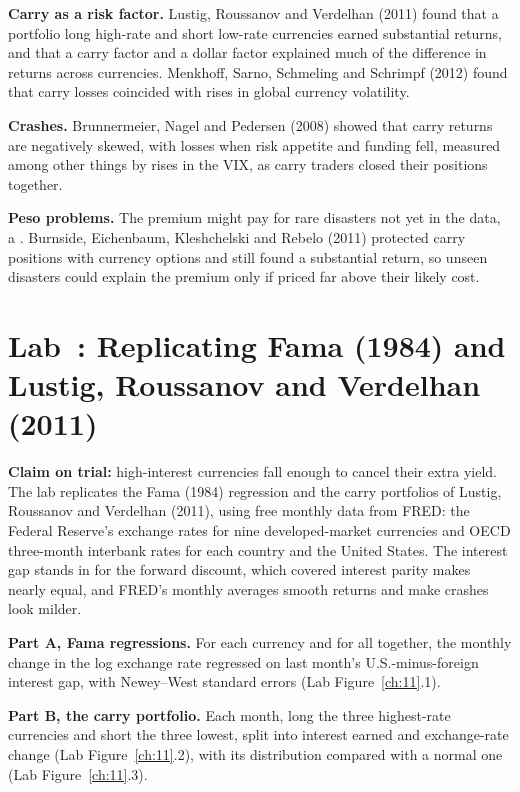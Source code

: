 \textbf{Carry as a risk factor.} Lustig, Roussanov and Verdelhan (2011) found that a portfolio long high-rate and short low-rate currencies earned substantial returns, and that a carry factor and a dollar factor explained much of the difference in returns across currencies. Menkhoff, Sarno, Schmeling and Schrimpf (2012) found that carry losses coincided with rises in global currency volatility.

\textbf{Crashes.} Brunnermeier, Nagel and Pedersen (2008) showed that carry returns are negatively skewed, with losses when risk appetite and funding fell, measured among other things by rises in the VIX, as carry traders closed their positions together.

\textbf{Peso problems.} The premium might pay for rare disasters not yet in the data, a . Burnside, Eichenbaum, Kleshchelski and Rebelo (2011) protected carry positions with currency options and still found a substantial return, so unseen disasters could explain the premium only if priced far above their likely cost.

\section{Lab~\thechapter: Replicating Fama (1984) and Lustig, Roussanov and Verdelhan (2011)}
\label{sec:06-lab}

\textbf{Claim on trial:} high-interest currencies fall enough to cancel their extra yield. The lab replicates the Fama (1984) regression and the carry portfolios of Lustig, Roussanov and Verdelhan (2011), using free monthly data from FRED: the Federal Reserve's exchange rates for nine developed-market currencies and OECD three-month interbank rates for each country and the United States. The interest gap stands in for the forward discount, which covered interest parity makes nearly equal, and FRED's monthly averages smooth returns and make crashes look milder.

\textbf{Part A, Fama regressions.} For each currency and for all together, the monthly change in the log exchange rate regressed on last month's U.S.-minus-foreign interest gap, with Newey--West standard errors (Lab Figure~\ref{ch:11}.1).

\textbf{Part B, the carry portfolio.} Each month, long the three highest-rate currencies and short the three lowest, split into interest earned and exchange-rate change (Lab Figure~\ref{ch:11}.2), with its distribution compared with a normal one (Lab Figure~\ref{ch:11}.3).

